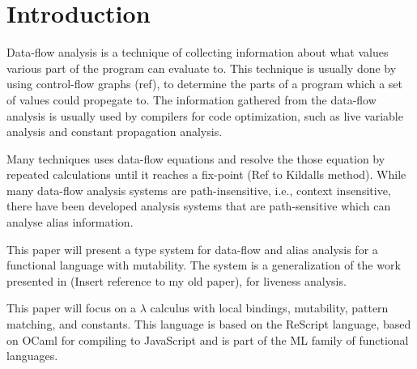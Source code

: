 \documentclass[../../master.tex]{subfiles}
\begin{document}
\section{Introduction}
Data-flow analysis is a technique of collecting information about what values various part of the program can evaluate to.
This technique is usually done by using control-flow graphs (ref), to determine the parts of a program which a set of values could propegate to.
The information gathered from the data-flow analysis is usually used by compilers for code optimization, such as live variable analysis and constant propagation analysis.

Many techniques uses data-flow equations and resolve the those equation by repeated calculations until it reaches a fix-point (Ref to Kildalls method).
While many data-flow analysis systems are path-insensitive, i.e., context insensitive, there have been developed analysis systems that are path-sensitive which can analyse alias information.
\bigskip

This paper will present a type system for data-flow and alias analysis for a functional language with mutability.
The system is a generalization of the work presented in (Insert reference to my old paper), for liveness analysis.

This paper will focus on a $\lambda$ calculus with local bindings, mutability, pattern matching, and constants.
This language is based on the ReScript language, based on OCaml for compiling to JavaScript and is part of the ML family of functional languages.
\end{document}
